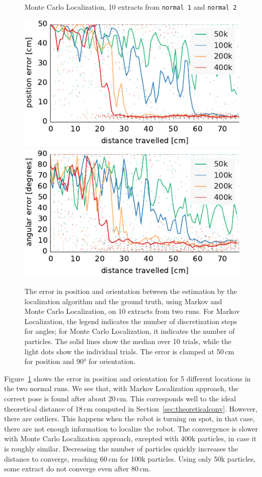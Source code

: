 \documentclass[letterpaper, 10pt, conference]{ieeeconf}
\newcommand{\Fig}[1]{Figure~\ref{fig:#1}}
\newcommand{\sect}[1]{Section~\ref{sec:#1}}
\begin{document}
\begin{figure}
\begin{center}
Monte Carlo Localization, 10 extracts from \texttt{normal 1} and \texttt{normal 2}
\end{center}
\includegraphics{mcl-small_runs_random_12-xy}\hfill
\includegraphics{mcl-small_runs_random_12-theta}

\caption{
The error in position and orientation between the estimation by the localization algorithm and the ground truth, using Markov and Monte Carlo Localization, on 10 extracts from two runs.
For Markov Localization, the legend indicates the number of discretization steps for angles; for Monte Carlo Localization, it indicates the number of particles.
The solid lines show the median over 10 trials, while the light dots show the individual trials.
The error is clamped at 50\,cm for position and 90° for orientation.}
\label{fig:small-runs}
\end{figure}

\Fig{small-runs} shows the error in position and orientation for 5 different locations in the two normal runs.
We see that, with Markov Localization approach, the correct pose is found after about 20\,cm.
This corresponds well to the ideal theoretical distance of 18\,cm computed in \sect{theoreticalconv}.
However, there are outliers.
This happens when the robot is turning on spot, in that case, there are not enough information to localize the robot.
The convergence is slower with Monte Carlo Localization approach, excepted with 400k particles, in case it is roughly similar.
Decreasing the number of particles quickly increases the distance to converge, reaching 60\,cm for 100k particles.
Using only 50k particles, some extract do not converge even after 80\,cm.
\end{document}
